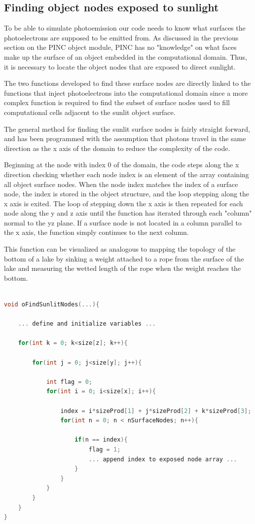 \subsection{Finding object nodes exposed to sunlight}

To be able to simulate photoemission our code needs to know what surfaces the photoelectrons are supposed to be emitted from. As discussed in the previous section on the PINC object module, PINC has no "knowledge" on what faces make up the surface of an object embedded in the computational domain. Thus, it is necessary to locate the object nodes that are exposed to direct sunlight.

The two functions developed to find these surface nodes are directly linked to the functions that inject photoelectrons into the computational domain since a more complex function is required to find the subset of surface nodes used to fill computational cells adjacent to the sunlit object surface. 

The general method for finding the sunlit surface nodes is fairly straight forward, and has been programmed with the assumption that photons travel in the same direction as the x axis of the domain to reduce the complexity of the code. 

Beginning at the node with index 0 of the domain, the code steps along the x direction checking whether each node index is an element of the array containing all object surface nodes. When the node index matches the index of a surface node, the index is stored in the object structure, and the loop stepping along the x axis is exited. The loop of stepping down the x axis is then repeated for each node along the y and z axis until the function has iterated through each "column" normal to the yz plane. If a surface node is not located in a column parallel to the x axis, the function simply continues to the next column.

This function can be visualized as analogous to mapping the topology of the bottom of a lake by sinking a weight attached to a rope from the surface of the lake and measuring the wetted length of the rope when the weight reaches the bottom.



\begin{lstlisting}[language=C]

void oFindSunlitNodes(...){

    ... define and initialize variables ...

    for(int k = 0; k<size[z]; k++){
    
        for(int j = 0; j<size[y]; j++){
                
            int flag = 0;
            for(int i = 0; i<size[x]; i++){
                
                index = i*sizeProd[1] + j*sizeProd[2] + k*sizeProd[3];
                for(int n = 0; n < nSurfaceNodes; n++){
                    
                    if(n == index){
                        flag = 1;
                        ... append index to exposed node array ...
                    }
                }
            }
        }
    }
}
\end{lstlisting}




